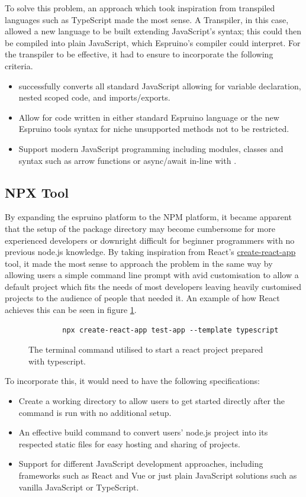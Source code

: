 \documentclass{l4proj}
\begin{document}
To solve this problem, an approach which took inspiration from transpiled languages such as TypeScript made the most sense. A Transpiler, in this case, allowed a new language to be built extending JavaScript's syntax; this could then be compiled into plain JavaScript, which Espruino's compiler could interpret. For the transpiler to be effective, it had to ensure to incorporate the following criteria.
\\
\begin{itemize}
    \item successfully converts all standard JavaScript allowing for variable declaration, nested scoped code, and imports/exports.
    \item Allow for code written in either standard Espruino language or the new Espruino tools syntax for niche unsupported methods not to be restricted.
    \item Support modern JavaScript programming including modules, classes and syntax such as arrow functions or async/await in-line with \cite{kolce2018javascript}.
\end{itemize}

\subsection{NPX Tool}
\text By expanding the espruino platform to the NPM platform, it became apparent that the setup of the package directory may become cumbersome for more experienced developers or downright difficult for beginner programmers with no previous node.js knowledge. By taking inspiration from React's \href{https://reactjs.org/docs/create-a-new-react-app.html}{create-react-app} tool, it made the most sense to approach the problem in the same way by allowing users a simple command line prompt with avid customisation to allow a default project which fits the needs of most developers leaving heavily customised projects to the audience of people that needed it. An example of how React achieves this can be seen in figure \ref{fig:create-react-app}.
\begin{figure}[H]
    \centering
    \begin{lstlisting}
        npx create-react-app test-app --template typescript
    \end{lstlisting}
    \caption{The terminal command utilised to start a react project prepared with typescript.}
    \label{fig:create-react-app}
\end{figure}
\text To incorporate this, it would need to have the following specifications:
\begin{itemize}
    \item Create a working directory to allow users to get started directly after the command is run with no additional setup.
    \item An effective build command to convert users' node.js project into its respected static files for easy hosting and sharing of projects.
    \item Support for different JavaScript development approaches, including frameworks such as React and Vue or just plain JavaScript solutions such as vanilla JavaScript or TypeScript.
\end{itemize}
\end{document}
